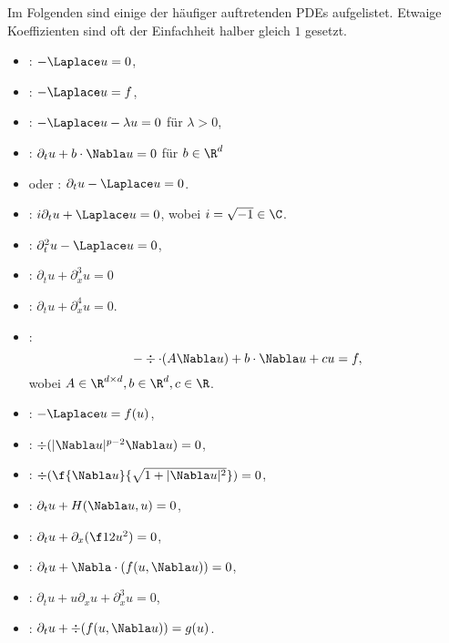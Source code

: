 Im Folgenden sind einige der häufiger auftretenden PDEs aufgelistet.
Etwaige Koeffizienten sind oft der Einfachheit halber gleich $1$ gesetzt.

\begin{ex} \label{1.10}
	\begin{itemize}
		\item
			: $-\Laplace u = 0$,
		\item
			: $-\Laplace u = f$,
		\item
			: $-\Laplace u - \lambda u = 0$ für $\lambda > 0$,
		\item
			: $\partial_t u + b \cdot \Nabla u = 0$ für $b \in \R^d$
		\item
			 oder : $\partial_t u - \Laplace u = 0$.
		\item
			: $i \partial_t u + \Laplace u = 0$, wobei $i = \sqrt{-1} \in \C$.
		\item
			: $\partial_t^2 u - \Laplace u = 0$,
		\item
			: $\partial_t u + \partial_x^3 u = 0$
		\item
			: $\partial_t u + \partial_x^4 u = 0$.
		\item
			:
			\[
				- \div \cdot (A \Nabla u) + b \cdot \Nabla u + c u = f,
			\]
			wobei $A \in \R^{d\times d}, b \in \R^d, c \in \R$.
	\end{itemize}
\end{ex}

\begin{ex} \label{1.11}
	\begin{itemize}
		\item
			: $-\Laplace u = f(u)$,
		\item
			: $\div (|\Nabla u|^{p-2} \Nabla u) = 0$,
		\item
			: $\div ( \f{\Nabla u}{\sqrt{1 + |\Nabla u|^2}} ) = 0$,
		\item
			: $\partial_t u + H(\Nabla u, u) = 0$,
		\item
			: $\partial_t u + \partial_x(\f 12 u^2) = 0$,
		\item
			: $\partial_t u + \Nabla \cdot(f(u, \Nabla u)) = 0$,
		\item
			: $\partial_t u + u \partial_x u + \partial_x^3 u = 0$,
		\item
			: $\partial_t u + \div(f(u, \Nabla u)) = g(u)$.
	\end{itemize}
\end{ex}

